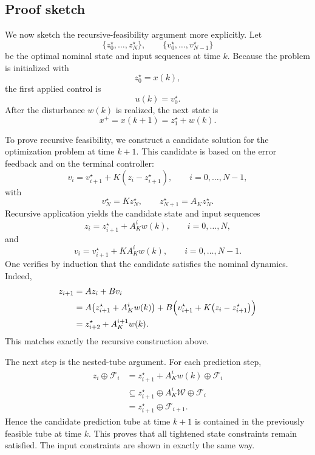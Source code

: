 \subsection{Proof sketch}

We now sketch the recursive-feasibility argument more explicitly. Let
\[
    \{z_0^\star,\ldots,z_N^\star\},
    \qquad
    \{v_0^\star,\ldots,v_{N-1}^\star\}
\]
be the optimal nominal state and input sequences at time \(k\). Because the problem is
initialized with
\[
    z_0^\star=x(k),
\]
the first applied control is
\[
    u(k)=v_0^\star.
\]
After the disturbance \(w(k)\) is realized, the next state is
\[
    x^+=x(k+1)=z_1^\star+w(k).
\]

To prove recursive feasibility, we construct a candidate solution for the optimization problem at
time \(k+1\). This candidate is based on the error feedback and on the terminal
controller:
\[
    v_i=v_{i+1}^\star+K(z_i-z_{i+1}^\star),
    \qquad i=0,\ldots,N-1,
\]
with
\[
    v_N^\star=Kz_N^\star,
    \qquad
    z_{N+1}^\star=A_K z_N^\star.
\]
Recursive application yields the candidate state and input sequences
\[
    z_i=z_{i+1}^\star+A_K^i w(k),
    \qquad i=0,\ldots,N,
\]
and
\[
    v_i=v_{i+1}^\star+KA_K^i w(k),
    \qquad i=0,\ldots,N-1.
\]
One verifies by induction that the candidate satisfies the nominal dynamics. Indeed,
\[
\begin{aligned}
    z_{i+1}
    &=Az_i+Bv_i \\
    &=A\bigl(z_{i+1}^\star+A_K^i w(k)\bigr)
      +B\Bigl(v_{i+1}^\star+K\bigl(z_i-z_{i+1}^\star\bigr)\Bigr) \\
    &=z_{i+2}^\star+A_K^{i+1}w(k).
\end{aligned}
\]
This matches exactly the recursive construction above.

The next step is the nested-tube argument. For each prediction step,
\[
\begin{aligned}
    z_i\oplus \mathcal F_i
    &=
    z_{i+1}^\star+A_K^i w(k)\oplus \mathcal F_i \\
    &\subseteq
    z_{i+1}^\star\oplus A_K^i\mathcal W\oplus \mathcal F_i \\
    &=
    z_{i+1}^\star\oplus \mathcal F_{i+1}.
\end{aligned}
\]
Hence the candidate prediction tube at time \(k+1\) is contained in the previously feasible tube
at time \(k\). This proves that all tightened state constraints remain satisfied. The input
constraints are shown in exactly the same way.

